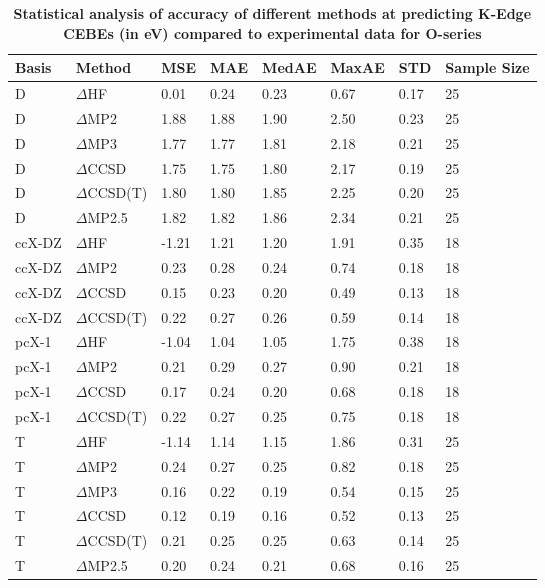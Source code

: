 \begin{table}
  \caption{\textbf{Statistical analysis of accuracy of different methods at predicting K-Edge CEBEs (in eV) compared to experimental data for O-series}}
  \label{tbl:method-summary-o}
  \begin{tabular}{l l l l l l l l }
    \hline
    \textbf{Basis} & \textbf{Method} & \textbf{MSE} & \textbf{MAE} & \textbf{MedAE} & \textbf{MaxAE} & \textbf{STD} & \textbf{Sample Size} \\ 
    \hline
    D & $\Delta$HF & 0.01 & 0.24 & 0.23 & 0.67 & 0.17 & 25 \\ 
    D & $\Delta$MP2 & 1.88 & 1.88 & 1.90 & 2.50 & 0.23 & 25 \\ 
    D & $\Delta$MP3 & 1.77 & 1.77 & 1.81 & 2.18 & 0.21 & 25 \\ 
    D & $\Delta$CCSD & 1.75 & 1.75 & 1.80 & 2.17 & 0.19 & 25 \\ 
    D & $\Delta$CCSD(T) & 1.80 & 1.80 & 1.85 & 2.25 & 0.20 & 25 \\ 
    D & $\Delta$MP2.5 & 1.82 & 1.82 & 1.86 & 2.34 & 0.21 & 25 \\ 
    ccX-DZ & $\Delta$HF & -1.21 & 1.21 & 1.20 & 1.91 & 0.35 & 18 \\ 
    ccX-DZ & $\Delta$MP2 & 0.23 & 0.28 & 0.24 & 0.74 & 0.18 & 18 \\ 
    ccX-DZ & $\Delta$CCSD & 0.15 & 0.23 & 0.20 & 0.49 & 0.13 & 18 \\ 
    ccX-DZ & $\Delta$CCSD(T) & 0.22 & 0.27 & 0.26 & 0.59 & 0.14 & 18 \\ 
    pcX-1 & $\Delta$HF & -1.04 & 1.04 & 1.05 & 1.75 & 0.38 & 18 \\ 
    pcX-1 & $\Delta$MP2 & 0.21 & 0.29 & 0.27 & 0.90 & 0.21 & 18 \\ 
    pcX-1 & $\Delta$CCSD & 0.17 & 0.24 & 0.20 & 0.68 & 0.18 & 18 \\ 
    pcX-1 & $\Delta$CCSD(T) & 0.22 & 0.27 & 0.25 & 0.75 & 0.18 & 18 \\ 
    T & $\Delta$HF & -1.14 & 1.14 & 1.15 & 1.86 & 0.31 & 25 \\ 
    T & $\Delta$MP2 & 0.24 & 0.27 & 0.25 & 0.82 & 0.18 & 25 \\ 
    T & $\Delta$MP3 & 0.16 & 0.22 & 0.19 & 0.54 & 0.15 & 25 \\ 
    T & $\Delta$CCSD & 0.12 & 0.19 & 0.16 & 0.52 & 0.13 & 25 \\ 
    T & $\Delta$CCSD(T) & 0.21 & 0.25 & 0.25 & 0.63 & 0.14 & 25 \\ 
    T & $\Delta$MP2.5 & 0.20 & 0.24 & 0.21 & 0.68 & 0.16 & 25 \\ 

\end{tabular}
\end{table}

